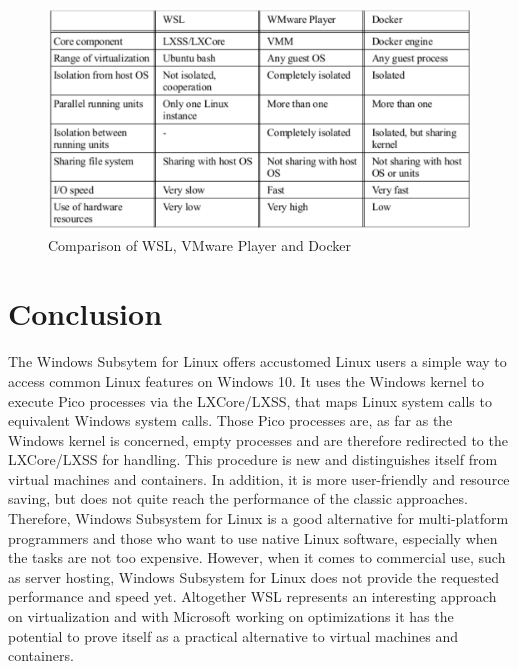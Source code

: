 \documentclass[utf8,biblatex, ngerman, english]{lni}
\begin{document}
\begin{figure}
  \includegraphics[width=1\textwidth]{Tabelle.pdf}
  \caption{Comparison of WSL, VMware Player and Docker}
  \label{tab:demo} 
\end{figure}

\clearpage
\section{Conclusion} 
The Windows Subsytem for Linux offers accustomed Linux users a simple way to access common Linux features on Windows 10.
It uses the Windows kernel to execute Pico processes via the LXCore/LXSS, that maps Linux system calls to equivalent Windows system calls. Those Pico processes are, as far as the Windows kernel is concerned, empty processes and are therefore redirected to the LXCore/LXSS for handling. This procedure is new and distinguishes itself from virtual machines and containers. In addition, it is more user-friendly and resource saving, but does not quite reach the performance of the classic approaches. Therefore, Windows Subsystem for Linux is a good alternative for multi-platform programmers and those who want to use native Linux software, especially when the tasks are not too expensive. However, when it comes to commercial use, such as server hosting, Windows Subsystem for Linux does not provide the requested performance and speed yet. Altogether WSL represents an interesting approach on virtualization and with Microsoft working on optimizations it has the potential to prove 
itself as a practical alternative to virtual machines and containers. 

\newpage
{}
\printbibliography
\end{document}
